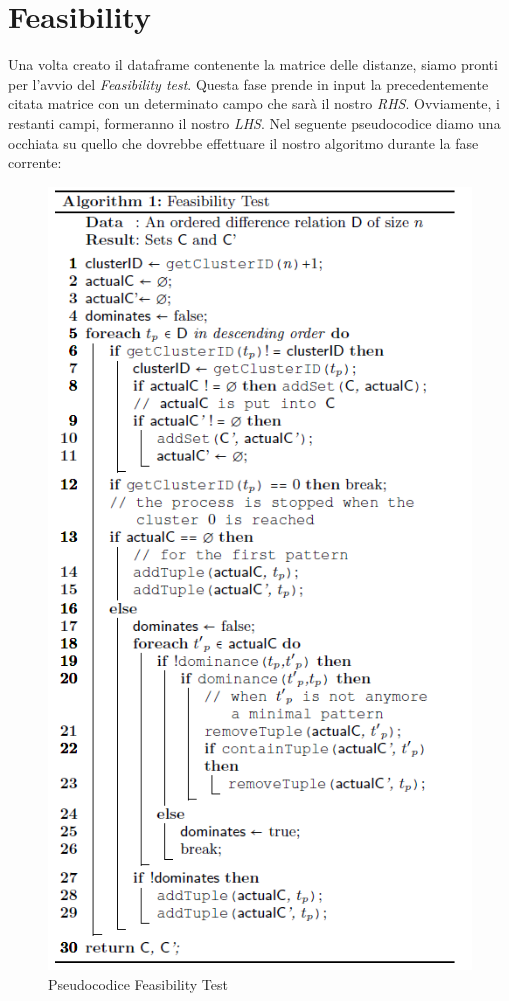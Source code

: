 \newpage
\section{Feasibility}
Una volta creato il dataframe contenente la matrice delle distanze, siamo pronti per l'avvio del \emph{Feasibility test}. Questa fase prende in input la precedentemente citata matrice con un determinato campo che sarà il nostro \emph{RHS}. Ovviamente, i restanti campi, formeranno il nostro \emph{LHS}.
Nel seguente pseudocodice diamo una occhiata su quello che dovrebbe effettuare il nostro algoritmo durante la fase corrente:\\
\begin{figure}[H]
	\centering
	\includegraphics[scale = 0.6]{Immagini/Feasibility.png}
	\caption{Pseudocodice Feasibility Test}
	\label{fig:Pseudocodice Feasibility Test}
\end{figure}
